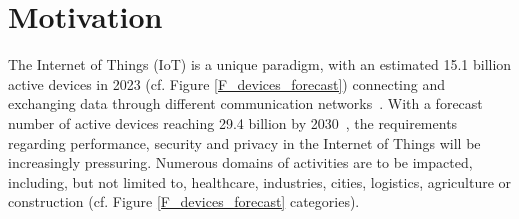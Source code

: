 \minitoc

\section{Motivation}
\label{S_motivation_intro}
The Internet of Things (IoT) is a unique paradigm, with an estimated 15.1 billion active devices in 2023 (cf. Figure \ref{F_devices_forecast}) connecting and exchanging data through different communication networks~\cite{StatistaIoT2023}. With a forecast number of active devices reaching 29.4 billion by 2030~\cite{StatistaIoT2023}, the requirements regarding performance, security and privacy in the Internet of Things will be increasingly pressuring. Numerous domains of activities are to be impacted, including, but not limited to, healthcare, industries, cities, logistics, agriculture or construction (cf. Figure \ref{F_devices_forecast} categories).

